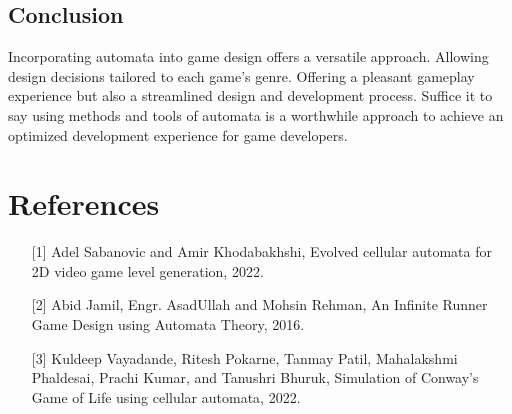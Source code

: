\documentclass[10pt,twocolumn]{article}
\begin{document}
\begin{twocolumn}
\section*{Conclusion}
Incorporating automata into game design offers a versatile approach. Allowing design decisions tailored to each game's genre. Offering a pleasant gameplay experience but also a streamlined design and development process. Suffice it to say using methods and tools of automata is a worthwhile approach to achieve an optimized development experience for game developers.
\end{twocolumn}

\section*{\small References}
\begin{enumerate}
\item [{[1]}] Adel Sabanovic and Amir Khodabakhshi, Evolved cellular automata for 2D video game level generation, 2022.
\item [{[2]}] Abid Jamil, Engr. AsadUllah and Mohsin Rehman, An Infinite Runner Game Design using Automata Theory, 2016.
\item [{[3]}] Kuldeep Vayadande, Ritesh Pokarne, Tanmay Patil, Mahalakshmi Phaldesai, Prachi Kumar, and Tanushri Bhuruk, Simulation of Conway's Game of Life using cellular automata, 2022.
\end{enumerate}
\end{document}
